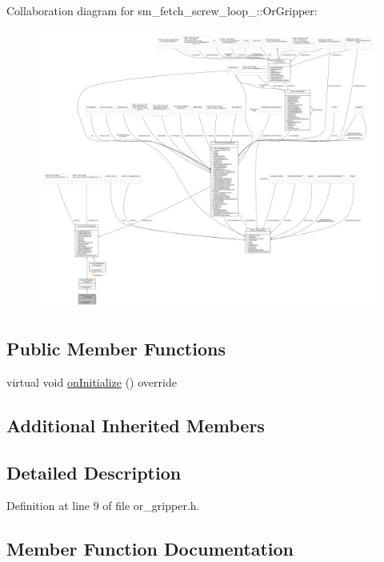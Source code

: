 Collaboration diagram for sm\+\_\+fetch\+\_\+screw\+\_\+loop\+\_\+:\+:Or\+Gripper\+:
\nopagebreak
\begin{figure}[H]
\begin{center}
\leavevmode
\includegraphics[width=350pt]{classsm__fetch__screw__loop__1_1_1OrGripper__coll__graph}
\end{center}
\end{figure}
\subsection*{Public Member Functions}
\begin{DoxyCompactItemize}
\item 
virtual void \hyperlink{classsm__fetch__screw__loop__1_1_1OrGripper_a754b53cdd8aea41c17938208d8eb8e69}{on\+Initialize} () override
\end{DoxyCompactItemize}
\subsection*{Additional Inherited Members}


\subsection{Detailed Description}


Definition at line 9 of file or\+\_\+gripper.\+h.



\subsection{Member Function Documentation}
\mbox{\label{classsm__fetch__screw__loop__1_1_1OrGripper_a754b53cdd8aea41c17938208d8eb8e69}} 

